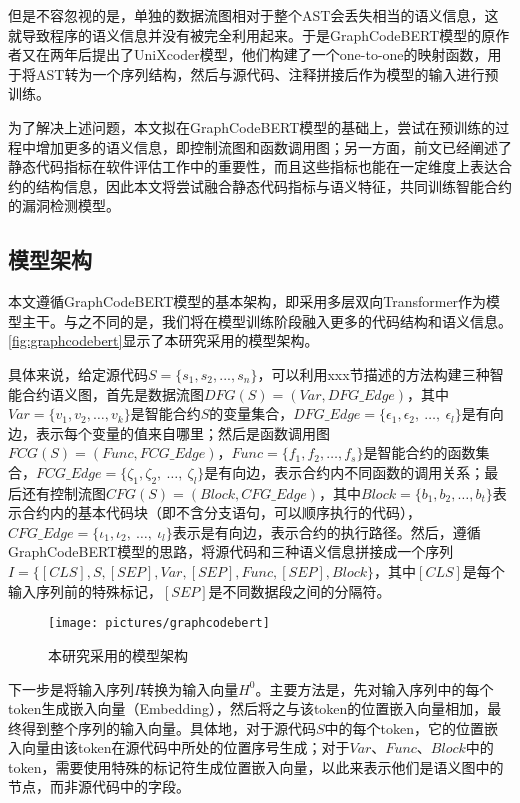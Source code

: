 但是不容忽视的是，单独的数据流图相对于整个AST会丢失相当的语义信息，这就导致程序的语义信息并没有被完全利用起来。于是GraphCodeBERT模型的原作者又在两年后提出了UniXcoder模型\cite{unixcoder}，他们构建了一个one-to-one的映射函数，用于将AST转为一个序列结构，然后与源代码、注释拼接后作为模型的输入进行预训练。

为了解决上述问题，本文拟在GraphCodeBERT模型的基础上，尝试在预训练的过程中增加更多的语义信息，即控制流图和函数调用图；另一方面，前文已经阐述了静态代码指标在软件评估工作中的重要性，而且这些指标也能在一定维度上表达合约的结构信息，因此本文将尝试融合静态代码指标与语义特征，共同训练智能合约的漏洞检测模型。

\subsection{模型架构}
\label{sec:模型架构}
本文遵循GraphCodeBERT模型的基本架构，即采用多层双向Transformer作为模型主干。与之不同的是，我们将在模型训练阶段融入更多的代码结构和语义信息。\autoref{fig:graphcodebert}显示了本研究采用的模型架构。%


具体来说，给定源代码$S=\{s_{1},s_{2},...,s_{n}\}$，可以利用xxx节描述的方法构建三种智能合约语义图，首先是数据流图$DFG(S)=(Var,DFG\_Edge)$，其中$Var=\{v_1,v_2,\ldots,v_k\}$是智能合约$S$的变量集合，$DFG\_Edge=\{\epsilon_1,\epsilon_2,~\ldots,~\epsilon_l\}$是有向边，表示每个变量的值来自哪里；然后是函数调用图$FCG(S)=(Func,FCG\_Edge)$，$Func=\{f_1,f_2,\ldots,f_s\}$是智能合约的函数集合，$FCG\_Edge=\{\zeta_1,\zeta_2,~\ldots,~\zeta_l\}$是有向边，表示合约内不同函数的调用关系；最后还有控制流图$CFG(S)=(Block,CFG\_Edge)$，其中$Block=\{b_1,b_2,\ldots,b_t\}$表示合约内的基本代码块（即不含分支语句，可以顺序执行的代码），$CFG\_Edge=\{\iota_1,\iota_2,~\ldots,~\iota_l\}$表示是有向边，表示合约的执行路径。然后，遵循GraphCodeBERT模型的思路，将源代码和三种语义信息拼接成一个序列$I=\{[CLS],S,[SEP],Var,[SEP],Func,[SEP],Block\}$，其中$[CLS]$是每个输入序列前的特殊标记，$[SEP]$是不同数据段之间的分隔符。
\begin{figure}[htbp]
    \centering
    \texttt{[image: pictures/graphcodebert]}
    \caption{\label{fig:graphcodebert}本研究采用的模型架构}
\end{figure}

下一步是将输入序列$I$转换为输入向量$H^0$。主要方法是，先对输入序列中的每个token生成嵌入向量（Embedding），然后将之与该token的位置嵌入向量相加，最终得到整个序列的输入向量。具体地，对于源代码$S$中的每个token，它的位置嵌入向量由该token在源代码中所处的位置序号生成；对于$Var$、$Func$、$Block$中的token，需要使用特殊的标记符生成位置嵌入向量，以此来表示他们是语义图中的节点，而非源代码中的字段。


